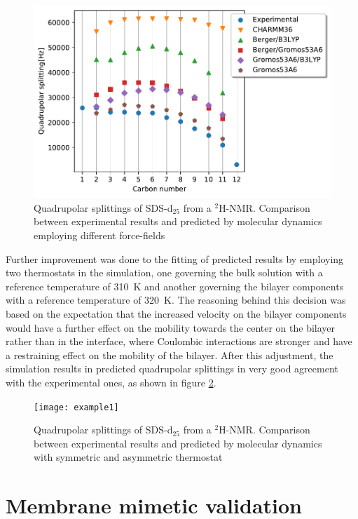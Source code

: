 \documentclass[9pt]{article}
\begin{document}
\begin{figure}[h]
\centering
  \includegraphics[width=\columnwidth]{calibration}
  \caption{Quadrupolar splittings of SDS-d$_{25}$ from a $^2$H-NMR. Comparison
    between experimental results and predicted by molecular dynamics employing
    different force-fields}
  \label{fig:calibration}
\end{figure}

Further improvement was done to the fitting of predicted results by employing
two thermostats in the simulation, one governing the bulk solution with a
reference temperature of \SI{310}{K} and another governing the bilayer
components with a reference temperature of \SI{320}{K}. The reasoning behind
this decision was based on the expectation that the increased velocity on the
bilayer components would have a further effect on the mobility towards the
center on the bilayer rather than in the interface, where Coulombic interactions
are stronger and have a restraining effect on the mobility of the bilayer. After
this adjustment, the simulation results in predicted quadrupolar splittings in
very good agreement with the experimental ones, as shown in figure
\ref{fig:2nd_calibration}.

\begin{figure}[h]
\centering
  \texttt{[image: example1]}
  \caption{Quadrupolar splittings of SDS-d$_{25}$ from a $^2$H-NMR. Comparison
    between experimental results and predicted by molecular dynamics with
    symmetric and asymmetric thermostat}
  \label{fig:2nd_calibration}
\end{figure}

\section{Membrane mimetic validation}
\label{sec:validation}
\end{document}
